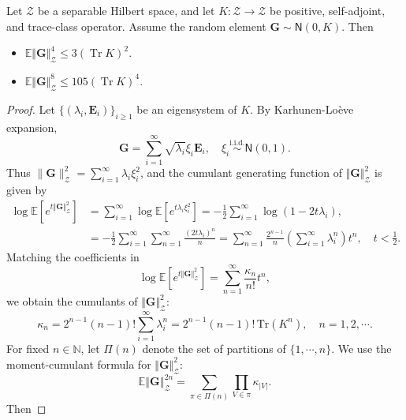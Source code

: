 \documentclass[11pt]{article}
\newcommand{\bbE}{\mathbb{E}}
\begin{document}
\begin{lemma}\label{lem:moment_gaussian}
Let $\mathcal Z$ be a separable Hilbert space, and let $K:\mathcal Z\to\mathcal Z$ be positive, self-adjoint, and trace-class operator. Assume the random element $\mathbf G\sim\mathsf{N}(0,K)$. Then
\begin{itemize}
    \item[(a)]$\bbE\Vert\mathbf G\Vert_\mathcal{Z}^4\leq 3(\operatorname{Tr} K)^2.$
    \item[(b)]$\bbE\Vert\mathbf G\Vert_\mathcal{Z}^8\leq 105(\operatorname{Tr} K)^4.$
\end{itemize}
\end{lemma}
\begin{proof}
Let $\{(\lambda_i,\mathbf E_i)\}_{i\ge 1}$ be an eigensystem of $K$. By Karhunen-Lo\`eve expansion,
\[
    \mathbf G
    =
    \sum_{i=1}^\infty\sqrt{\lambda_i}\xi_i\mathbf E_i,
    \quad
    \xi_i\overset{\mathrm{i.i.d.}}{\sim}\mathsf N(0,1).
\]
Thus $\|\mathbf G\|_{\mathcal Z}^2=\sum_{i=1}^\infty \lambda_i\xi_i^2$, and the cumulant generating function of $\Vert\mathbf G\Vert_\mathcal{Z}^2$ is given by
\begin{align*}
    \log\bbE\left[e^{t\Vert\mathbf G\Vert_\mathcal{Z}^2}\right]&=\sum_{i=1}^\infty\log\bbE\left[e^{t\lambda_i\xi_i^2}\right]=-\frac{1}{2}\sum_{i=1}^\infty\log(1-2t\lambda_i),\\
    &=-\frac{1}{2}\sum_{i=1}^\infty\sum_{n=1}^\infty\frac{(2t\lambda_i)^n}{n}=\sum_{n=1}^\infty\frac{2^{n-1}}{n}\left(\sum_{i=1}^\infty\lambda_i^n\right) t^n,\quad t<\frac{1}{2}.
\end{align*}
Matching the coefficients in
\begin{equation*}
    \log\bbE\left[e^{t\Vert\mathbf G\Vert_\mathcal{Z}^2}\right]=\sum_{n=1}^\infty\frac{\kappa_n}{n!}t^n,
\end{equation*}
we obtain the cumulants of $\Vert\mathbf{G}\Vert_\mathcal{Z}^2$:
\begin{equation}
\kappa_n=2^{n-1}(n-1)!\sum_{i=1}^\infty\lambda_i^n=2^{n-1}(n-1)!\,\mathrm{Tr}(K^n),\quad n=1,2,\cdots.
\end{equation}
For fixed $n\in\mathbb N$, let $\Pi(n)$ denote the set of partitions of $\{1,\cdots,n\}$. We use the moment-cumulant formula for $\Vert\mathbf{G}\Vert_\mathcal{Z}^2$:
\begin{equation*}
    \bbE\left\Vert\mathbf G\right\Vert_\mathcal{Z}^{2n}=\sum_{\pi\in\Pi(n)}\prod_{V\in\pi}\kappa_{\vert V\vert}.
\end{equation*}
Then

\end{proof}
\end{document}
